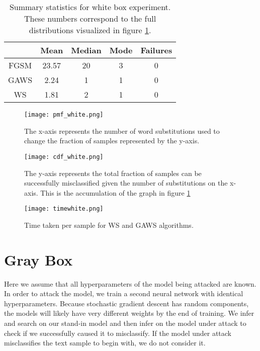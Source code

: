 \begin{table}
\centering
\begin{tabular}{ |c|c|c|c|c| } \hline
& Mean & Median & Mode & Failures\\ \hline
FGSM & 23.57 & 20 & 3 & 0\\ \hline
GAWS & 2.24 & 1 & 1 & 0\\ \hline
WS & 1.81 & 2 & 1 & 0\\ \hline
\end{tabular}
\caption{Summary statistics for white box experiment.  These numbers correspond to the full distributions visualized in figure \ref{fig:whitepmf}.}
\label{tab:whitesum}
\end{table}
\begin{figure}
    \centering
    \texttt{[image: pmf\_white.png]}
    \caption{The x-axis represents the number of word substitutions used to change the fraction of samples represented by the y-axis.}
    \label{fig:whitepmf}
\end{figure}

\begin{figure}
    \centering
    \texttt{[image: cdf\_white.png]}
    \caption{The y-axis represents the total fraction of samples can be successfully misclassified given the number of substitutions on the x-axis.  This is the accumulation of the graph in figure \ref{fig:whitepmf}}
    \label{fig:whitecdf}
\end{figure}

\begin{figure}
    \centering
    \texttt{[image: timewhite.png]}
    \caption{Time taken per sample for WS and GAWS algorithms.}
    \label{fig:whitetime}
\end{figure}

\section{Gray Box}
Here we assume that all hyperparameters of the model being attacked are known.  In order to attack the model, we train a second neural network with identical hyperparameters.  Because stochastic gradient descent has random components, the models will likely have very different weights by the end of training.  We infer and search on our stand-in model and then infer on the model under attack to check if we successfully caused it to misclassify.  If the model under attack misclassifies the text sample to begin with, we do not consider it.

